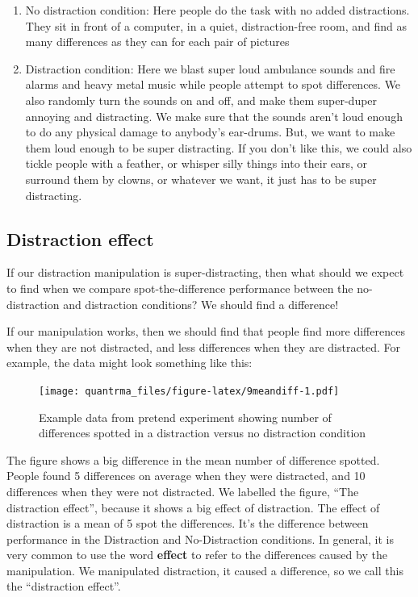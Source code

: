 \documentclass[
]{book}
\begin{document}
\begin{enumerate}
\def\labelenumi{\arabic{enumi}.}
\item
  No distraction condition: Here people do the task with no added distractions. They sit in front of a computer, in a quiet, distraction-free room, and find as many differences as they can for each pair of pictures
\item
  Distraction condition: Here we blast super loud ambulance sounds and fire alarms and heavy metal music while people attempt to spot differences. We also randomly turn the sounds on and off, and make them super-duper annoying and distracting. We make sure that the sounds aren't loud enough to do any physical damage to anybody's ear-drums. But, we want to make them loud enough to be super distracting. If you don't like this, we could also tickle people with a feather, or whisper silly things into their ears, or surround them by clowns, or whatever we want, it just has to be super distracting.
\end{enumerate}

\hypertarget{distraction-effect}{%
\subsection{Distraction effect}\label{distraction-effect}}

If our distraction manipulation is super-distracting, then what should we expect to find when we compare spot-the-difference performance between the no-distraction and distraction conditions? We should find a difference!

If our manipulation works, then we should find that people find more differences when they are not distracted, and less differences when they are distracted. For example, the data might look something like this:

\begin{figure}
\centering
\texttt{[image: quantrma\_files/figure-latex/9meandiff-1.pdf]}
\caption{\label{fig:9meandiff}Example data from pretend experiment showing number of differences spotted in a distraction versus no distraction condition}
\end{figure}

The figure shows a big difference in the mean number of difference spotted. People found 5 differences on average when they were distracted, and 10 differences when they were not distracted. We labelled the figure, ``The distraction effect'', because it shows a big effect of distraction. The effect of distraction is a mean of 5 spot the differences. It's the difference between performance in the Distraction and No-Distraction conditions. In general, it is very common to use the word \textbf{effect} to refer to the differences caused by the manipulation. We manipulated distraction, it caused a difference, so we call this the ``distraction effect''.
\end{document}

